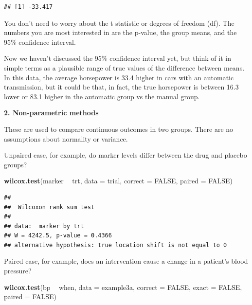 \documentclass[]{book}
\newenvironment{Shaded}{\begin{snugshade}}{\end{snugshade}}
\newcommand{\DataTypeTok}[1]{\textcolor[rgb]{0.13,0.29,0.53}{#1}}
\newcommand{\KeywordTok}[1]{\textcolor[rgb]{0.13,0.29,0.53}{\textbf{#1}}}
\newcommand{\NormalTok}[1]{#1}
\newcommand{\OperatorTok}[1]{\textcolor[rgb]{0.81,0.36,0.00}{\textbf{#1}}}
\newcommand{\OtherTok}[1]{\textcolor[rgb]{0.56,0.35,0.01}{#1}}
\newcommand{\StringTok}[1]{\textcolor[rgb]{0.31,0.60,0.02}{#1}}
\begin{document}
\begin{verbatim}
## [1] -33.417
\end{verbatim}

You don't need to worry about the t statistic or degrees of freedom (df). The numbers you are most interested in are the p-value, the group means, and the 95\% confidence interval.

Now we haven't discussed the 95\% confidence interval yet, but think of it in simple terms as a plausible range of true values of the difference between means. In this data, the average horsepower is 33.4 higher in cars with an automatic transmission, but it could be that, in fact, the true horsepower is between 16.3 lower or 83.1 higher in the automatic group vs the manual group.

\textbf{2. Non-parametric methods}

These are used to compare continuous outcomes in two groups. There are no assumptions about normality or variance.

Unpaired case, for example, do marker levels differ between the drug and placebo groups?

\begin{Shaded}
\begin{Highlighting}[]
\KeywordTok{wilcox.test}\NormalTok{(marker }\OperatorTok{~}\StringTok{ }\NormalTok{trt, }\DataTypeTok{data =}\NormalTok{ trial, }\DataTypeTok{correct =} \OtherTok{FALSE}\NormalTok{, }\DataTypeTok{paired =} \OtherTok{FALSE}\NormalTok{)}
\end{Highlighting}
\end{Shaded}

\begin{verbatim}
## 
##  Wilcoxon rank sum test
## 
## data:  marker by trt
## W = 4242.5, p-value = 0.4366
## alternative hypothesis: true location shift is not equal to 0
\end{verbatim}

Paired case, for example, does an intervention cause a change in a patient's blood pressure?

\begin{Shaded}
\begin{Highlighting}[]
\KeywordTok{wilcox.test}\NormalTok{(bp }\OperatorTok{~}\StringTok{ }\NormalTok{when, }\DataTypeTok{data =}\NormalTok{ example3a, }\DataTypeTok{correct =} \OtherTok{FALSE}\NormalTok{, }\DataTypeTok{exact =} \OtherTok{FALSE}\NormalTok{, }\DataTypeTok{paired =} \OtherTok{FALSE}\NormalTok{)}
\end{Highlighting}
\end{Shaded}
\end{document}
